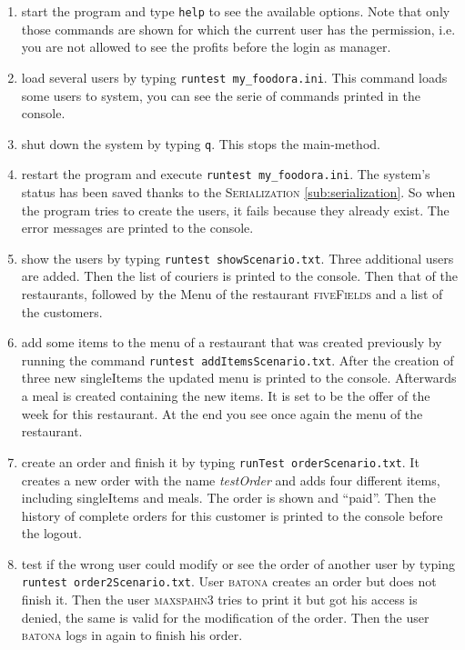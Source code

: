 \begin{enumerate}[itemsep=0mm]
	\item start the program and type \lstinline|help| to see the available options.
		Note that only those commands are shown for which the current user has the 
		permission, i.e. you are not allowed to see the profits before the login as 
		manager.
	\item load several users by typing \lstinline|runtest my_foodora.ini|. This command loads 
		some users to system, you can see the serie of commands printed in the console.
	\item shut down the system by typing \lstinline|q|. This stops the main-method.
	\item restart the program and execute \lstinline|runtest my_foodora.ini|. The system's 
		status has been saved thanks to the \textsc{Serialization} \ref{sub:serialization}.
		So when the program tries
		to create the users, it fails because they already exist. The error messages are 
		printed to the console.
	\item show the users by typing \lstinline|runtest showScenario.txt|. Three additional users
		are added. Then the list of couriers is printed to the console. Then that of the 
		restaurants, followed by the Menu of the restaurant \textsc{fiveFields} and a list of
		the customers.
	\item add some items to the menu of a restaurant that was created previously by running the 
		command \lstinline|runtest addItemsScenario.txt|. After the creation of three new 
		singleItems the updated menu is printed to the console. Afterwards a meal is created
		containing the new items. It is set to be the offer of the week for this restaurant.
		At the end you see once again the menu of the restaurant.
	\item create an order and finish it by typing \lstinline|runTest orderScenario.txt|. It 
		creates a new order with the name \textit{testOrder} and adds four different items, 
		including singleItems and meals. The order is shown and ``paid''. Then the history
		of complete orders for this customer is printed to the console before the logout.
	\item test if the wrong user could modify or see the order of another user by typing
		\lstinline|runtest order2Scenario.txt|. User \textsc{batona} creates an order but 
		does not finish it. Then the user \textsc{maxspahn3} tries to print it but got his
		access is denied, the same is valid for the modification of the order. Then the 
		user \textsc{batona} logs in again to finish his order.

\end{enumerate}
